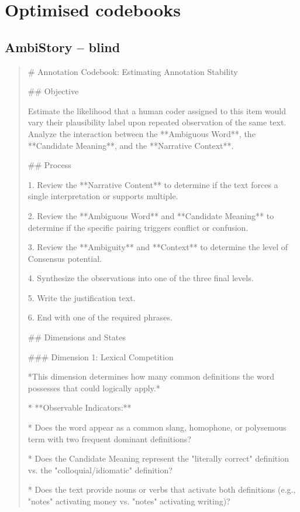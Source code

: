 \section{Optimised codebooks}
\label{app:codebooks}
\subsection*{AmbiStory -- blind}
\begin{quote}\small
# Annotation Codebook: Estimating Annotation Stability



## Objective

Estimate the likelihood that a human coder assigned to this item would vary their plausibility label upon repeated observation of the same text. Analyze the interaction between the **Ambiguous Word**, the **Candidate Meaning**, and the **Narrative Context**.



## Process

1.  Review the **Narrative Content** to determine if the text forces a single interpretation or supports multiple.

2.  Review the **Ambiguous Word** and **Candidate Meaning** to determine if the specific pairing triggers conflict or confusion.

3.  Review the **Ambiguity** and **Context** to determine the level of Consensus potential.

4.  Synthesize the observations into one of the three final levels.

5.  Write the justification text.

6.  End with one of the required phrases.



## Dimensions and States



### Dimension 1: Lexical Competition

*This dimension determines how many common definitions the word possesses that could logically apply.*

*   **Observable Indicators:**

    *   Does the word appear as a common slang, homophone, or polysemous term with two frequent dominant definitions?

    *   Does the Candidate Meaning represent the "literally correct" definition vs. the "colloquial/idiomatic" definition?

    *   Does the text provide nouns or verbs that activate both definitions (e.g., "notes" activating money vs. "notes" activating writing)?




\end{quote}
